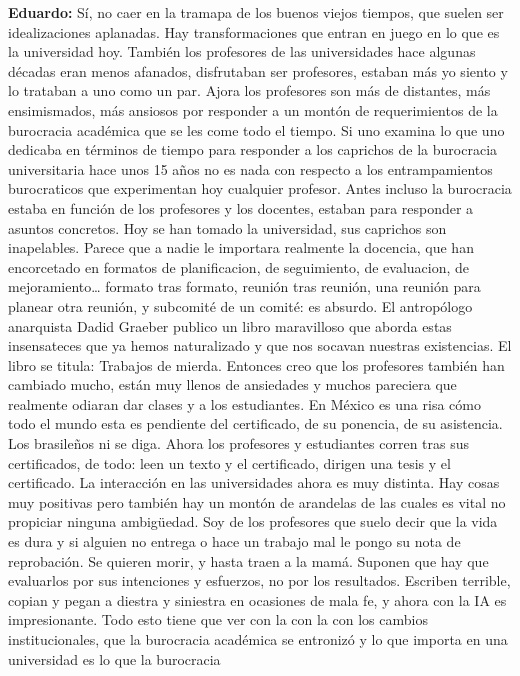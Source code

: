 \documentclass[
]{interact}
\begin{document}
\textbf{Eduardo:} Sí, no caer en la tramapa de los buenos viejos
tiempos, que suelen ser idealizaciones aplanadas. Hay transformaciones
que entran en juego en lo que es la universidad hoy. También los
profesores de las universidades hace algunas décadas eran menos
afanados, disfrutaban ser profesores, estaban más yo siento y lo
trataban a uno como un par. Ajora los profesores son más de distantes,
más ensimismados, más ansiosos por responder a un montón de
requerimientos de la burocracia académica que se les come todo el
tiempo. Si uno examina lo que uno dedicaba en términos de tiempo para
responder a los caprichos de la burocracia universitaria hace unos 15
años no es nada con respecto a los entrampamientos burocraticos que
experimentan hoy cualquier profesor. Antes incluso la burocracia estaba
en función de los profesores y los docentes, estaban para responder a
asuntos concretos. Hoy se han tomado la universidad, sus caprichos son
inapelables. Parece que a nadie le importara realmente la docencia, que
han encorcetado en formatos de planificacion, de seguimiento, de
evaluacion, de mejoramiento\ldots{} formato tras formato, reunión tras
reunión, una reunión para planear otra reunión, y subcomité de un
comité: es absurdo. El antropólogo anarquista Dadid Graeber publico un
libro maravilloso que aborda estas insensateces que ya hemos
naturalizado y que nos socavan nuestras existencias. El libro se titula:
Trabajos de mierda. Entonces creo que los profesores también han
cambiado mucho, están muy llenos de ansiedades y muchos pareciera que
realmente odiaran dar clases y a los estudiantes. En México es una risa
cómo todo el mundo esta es pendiente del certificado, de su ponencia, de
su asistencia. Los brasileños ni se diga. Ahora los profesores y
estudiantes corren tras sus certificados, de todo: leen un texto y el
certificado, dirigen una tesis y el certificado. La interacción en las
universidades ahora es muy distinta. Hay cosas muy positivas pero
también hay un montón de arandelas de las cuales es vital no propiciar
ninguna ambigüedad. Soy de los profesores que suelo decir que la vida es
dura y si alguien no entrega o hace un trabajo mal le pongo su nota de
reprobación. Se quieren morir, y hasta traen a la mamá. Suponen que hay
que evaluarlos por sus intenciones y esfuerzos, no por los resultados.
Escriben terrible, copian y pegan a diestra y siniestra en ocasiones de
mala fe, y ahora con la IA es impresionante. Todo esto tiene que ver con
la con la con los cambios institucionales, que la burocracia académica
se entronizó y lo que importa en una universidad es lo que la burocracia
\end{document}

